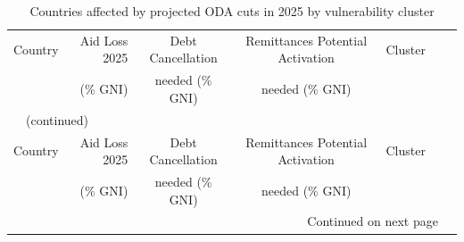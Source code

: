 \documentclass[fleqn,10pt,twocolumn]{wlscirep}
\begin{document}
\clearpage
\onecolumn
\small
\begin{longtable}{lrccccc}
	\caption{Countries affected by projected ODA cuts in 2025 by vulnerability cluster}
	\label{tab:oda_clusters}\\
	
	\toprule
	Country & Aid Loss 2025 & Debt Cancellation & Remittances Potential Activation &  Cluster \\
	& (\% GNI) & needed (\% GNI) & needed (\% GNI) & \\
	\midrule
	\endfirsthead
	
	\multicolumn{6}{l}{\tablename\ \thetable\ (continued)}\\
	\toprule
	Country & Aid Loss 2025 & Debt Cancellation & Remittances Potential Activation &  Cluster \\
	& (\% GNI) & needed (\% GNI) & needed (\% GNI) & \\
	\midrule
	\endhead
	
	\midrule
	\multicolumn{6}{r}{Continued on next page}
	\endfoot
	
	\bottomrule
	\endlastfoot
	

\end{longtable}
\end{document}
